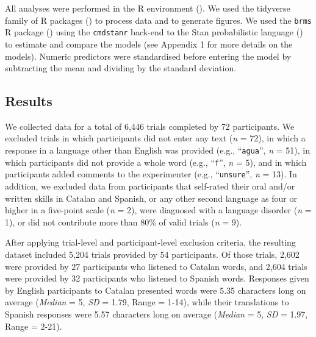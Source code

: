 \documentclass[
]{article}
\begin{document}
All analyses were performed in the R environment
(). We used the
tidyverse family of R packages
() to process
data and to generate figures. We used the \texttt{brms} R package
() using the
\texttt{cmdstanr} back-end to the Stan probabilistic language
() to estimate
and compare the models (see Appendix 1 for more details on the models).
Numeric predictors were standardised before entering the model by
subtracting the mean and dividing by the standard deviation.

\subsection{Results}\label{results}

We collected data for a total of 6,446 trials completed by 72
participants. We excluded trials in which participants did not enter any
text (\emph{n} = 72), in which a response in a language other than
English was provided (e.g., ``\texttt{agua}'', \emph{n} = 51), in which
participants did not provide a whole word (e.g., ``\texttt{f}'',
\emph{n} = 5), and in which participants added comments to the
experimenter (e.g., ``\texttt{unsure}'', \emph{n} = 13). In addition, we
excluded data from participants that self-rated their oral and/or
written skills in Catalan and Spanish, or any other second language as
four or higher in a five-point scale (\emph{n} = 2), were diagnosed with
a language disorder (\emph{n} = 1), or did not contribute more than 80\%
of valid trials (\emph{n} = 9).

After applying trial-level and participant-level exclusion criteria, the
resulting dataset included 5,204 trials provided by 54 participants. Of
those trials, 2,602 were provided by 27 participants who listened to
Catalan words, and 2,604 trials were provided by 32 participants who
listened to Spanish words. Responses given by English participants to
Catalan presented words were 5.35 characters long on average
(\emph{Median} = 5, \emph{SD} = 1.79, Range = 1-14), while their
translations to Spanish responses were 5.57 characters long on average
(\emph{Median} = 5, \emph{SD} = 1.97, Range = 2-21).
\end{document}
